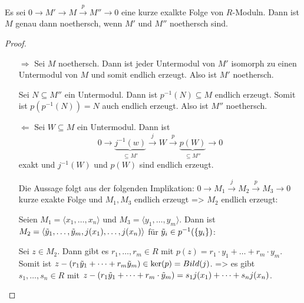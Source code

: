 \documentclass[../main.tex]{subfiles}
\begin{document}
\begin{lemma}\label{theo:5.43}
    Es sei $0\rightarrow M'\rightarrow M\overset{p}{\rightarrow }M''\rightarrow 0$ eine kurze exalkte Folge von $R$-Moduln.
    Dann ist $M$ genau dann noethersch, wenn $M'$ und $M''$ noethersch sind.
\end{lemma}
\begin{proof} $ $
    \begin{itemize}
        \item[$\Rightarrow$]
        Sei $M$ noethersch.
        Dann ist jeder Untermodul von $M'$ isomorph zu einen Untermodul von $M$ und somit endlich erzeugt.
        Also ist $M'$ noethersch.

        Sei $N\subseteq M''$ ein Untermodul.
        Dann ist $p^{-1}(N)\subseteq M$ endlich erzeugt.
        Somit ist $p(p^{-1}(N)) = N$ auch endlich erzeugt. Also ist $M''$ noethersch.

        \item[$\Leftarrow$]
        Sei $W\subseteq M$ ein Untermodul.
        Dann ist
        $$0\rightarrow \underbrace{j^{-1}(w)}_{\subseteq M'}\overset{j}{\rightarrow} W \overset{p}{\rightarrow} \underbrace{p(W)}_{\subseteq M''}\rightarrow 0$$
        exakt und $j^{-1}(W)$ und $p(W)$ sind endlich erzeugt.

        Die Aussage folgt aus der folgenden Implikation:
        $0\rightarrow M_1 \overset{j}{\rightarrow} M_2 \overset{p}{\rightarrow} M_3 \rightarrow 0$ kurze exakte Folge und $M_1,M_3$ endlich erzeugt => $M_2$ endlich erzeugt:
        
        Seien $M_1 = \langle x_1,\dots, x_n\rangle$ und $M_3=\langle y_1, \dots, y_m\rangle$.
        Dann ist $M_2 = \langle \Tilde{y}_1,\dots, \Tilde{y}_m, j(x_1),\dots,j(x_n)\rangle$ für $\Tilde{y}_i\in p^{-1}(\{y_i\})$:

        Sei $z\in M_2$. Dann gibt es $r_1,\dots,r_m\in R$ mit $p(z) = r_1\cdot y_1+ \dots + r_m\cdot y_m$.
        Somit ist $z-(r_1\Tilde{y}_1 + \dots + r_m \Tilde{y}_m)\in\ker (p) = Bild(j)$.
        => es gibt $s_1,\dots, s_n\in R$ mit $z-(r_1\Tilde{y}_1 + \dots +r_m\cdot \Tilde{y}_m) = s_1 j(x_1) + \dots + s_n j(x_n)$.
    \end{itemize}
\end{proof}
\end{document}
